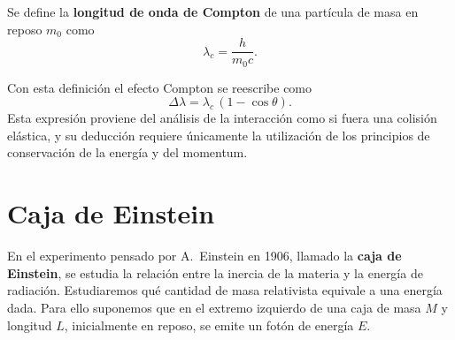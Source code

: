 \begin{definicion}
Se define la \textbf{longitud de onda de Compton} de una partícula de
masa en reposo $m_0$ como
\[
\lambda_c = \frac{h}{m_0c} . \tag{106}
\]
\end{definicion}

Con esta definición el efecto Compton se reescribe como
\[
\Delta\lambda = \lambda_c\,(1-\cos\theta). \tag{107}
\]
Esta expresión proviene del análisis de la interacción como si fuera una
colisión elástica, y su deducción requiere únicamente la utilización de
los principios de conservación de la energía y del momentum.

\section{Caja de Einstein}

En el experimento pensado por A.~Einstein en 1906, llamado la
\textbf{caja de Einstein}, se estudia la relación entre la inercia de la
materia y la energía de radiación. Estudiaremos qué cantidad de masa
relativista equivale a una energía dada. Para ello suponemos que en el
extremo izquierdo de una caja de masa $M$ y longitud $L$, inicialmente en
reposo, se emite un fotón de energía $E$.

\begin{center}
\end{center}

